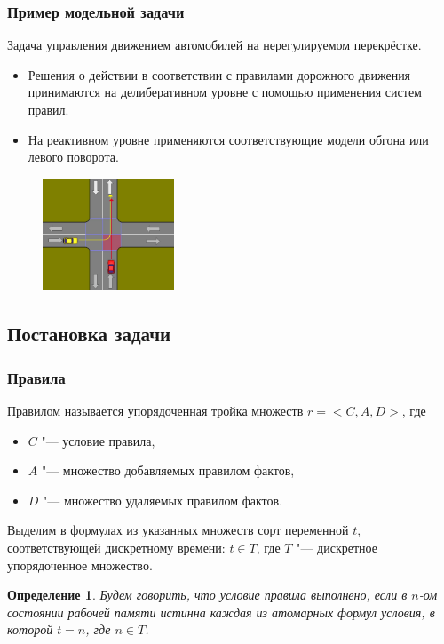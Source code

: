 \documentclass[default]{beamer}
\newtheorem{Def}{Определение}
\begin{document}
	\begin{frame}
		\frametitle{Пример модельной задачи}
		
		Задача управления движением автомобилей на нерегулируемом перекрёстке.
		\begin{itemize}
			\item Решения о действии в соответствии с правилами дорожного движения принимаются на делиберативном уровне с помощью применения систем правил.
			\item На реактивном уровне применяются соответствующие модели обгона или левого поворота.
		\end{itemize}
		\par\bigskip
		\begin{figure}
			\centering
			\includegraphics[width=0.35\textwidth]{dyn_cars.jpg}
		\end{figure}
	\end{frame}
					
	\subsection{Постановка задачи}

	\begin{frame}
		\frametitle{Правила}
		
		Правилом называется упорядоченная тройка множеств $r=<C,A,D>$, где
		\begin{itemize}
			\item $C$ "--- условие правила,
			\item $A$ "--- множество добавляемых правилом фактов,
			\item $D$ "--- множество удаляемых правилом фактов.
		\end{itemize}
		\par\bigskip
		Выделим в формулах из указанных множеств сорт переменной $t$, соответствующей дискретному времени: $t\in T$, где $T$ "--- дискретное упорядоченное множество.
		
		\begin{Def}
			Будем говорить, что условие правила выполнено, если в $n$-ом состоянии рабочей памяти истинна каждая из атомарных формул условия, в которой $t=n$, где $n\in T$.
		\end{Def}
	\end{frame}
\end{document}
